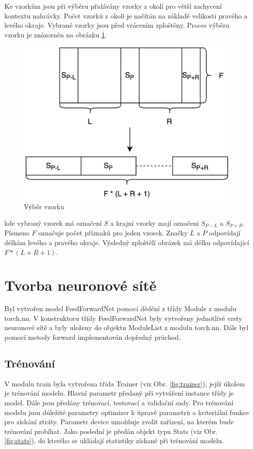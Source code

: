 \documentclass[FM,BP]{tulthesis}
\begin{document}
Ke vzorkům jsou při výběru přidávány vzorky z okolí pro větší zachycení kontextu nahrávky. Počet vzorků z okolí je načítán na základě velikosti pravého a levého okraje. Vybrané vzorky jsou před vrácením zploštěny. Proces výběru vzorku je znázorněn na obrázku \ref{fig:sample_selection}.

\begin{figure}[h]
\centerline{\includegraphics[scale=.125]{sample_selection.png}}
\caption{Výběr vzorku}
\label{fig:sample_selection}
\end{figure}
\FloatBarrier

kde vybraný vzorek má označení $ S $ a krajní vzorky mají označení $ S_{P-L} $ a $ S_{P+R} $. Písmeno $ F $ označuje počet příznaků pro jeden vzorek. Značky $ L $ a $ P $ odpovídají délkám levého a pravého okraje. Výsledný zploštělí obrázek má délku odpovídající $ F * (L + R + 1) $.

\section{Tvorba neuronové sítě} %
Byl vytvořen model FeedForwardNet pomocí dědění z třídy Module z modulu torch.nn. V konstruktoru třídy FeedForwardNet byly vytvořeny jednotlivé vrsty neuronové sítě a byly uloženy do objektu ModuleList z modulu torch.nn. Dále byl pomocí metody forward implementován dopředný průchod.

\subsection{Trénování} %
V modulu train byla vytvořena třída Trainer (viz Obr. \ref{fig:trainer}), jejíž úkolem je trénování modelu. Hlavní parametr předaný při vytváření instance třídy je model. Dále jsou předány trénovací, testovací a validační sady. Pro trénování modelu jsou důležité parametry optimizer k úpravě parametrů a kriteriální funkce pro získání ztráty. Parametr device umožňuje zvolit zařízení, na kterém bude trénování probíhat. Jako poslední je předán objekt typu Stats (viz Obr. \ref{fig:stats}), do kterého se ukládají statistiky získané při trénování modelu. 
\end{document}
